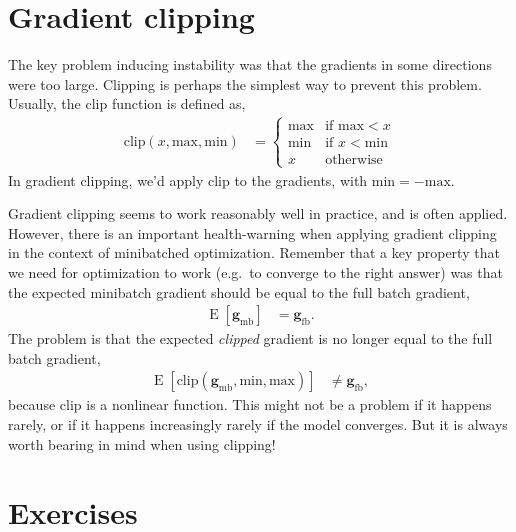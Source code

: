 \documentclass{article}
\newcommand{\bracket}[3]{\left#1 #3 \right#2}
\newcommand{\sqb}{\bracket{[}{]}}
\newcommand{\0}{\mathbf{0}}
\newcommand{\g}{\mathbf{g}}
\newcommand{\gfb}{\g_\text{fb}}
\newcommand{\gmb}{\g_\text{mb}}
\newcommand{\E}{\operatorname{E}\sqb}
\begin{document}
\section{Gradient clipping}

The key problem inducing instability was that the gradients in some directions were too large.
Clipping is perhaps the simplest way to prevent this problem.
Usually, the clip function is defined as,
\begin{align}
  \text{clip}(x, \text{max}, \text{min}) &= \begin{cases}
    \text{max} & \text{if } \text{max} < x\\
    \text{min} & \text{if } x < \text{min} \\
    x & \text{otherwise}
  \end{cases}
\end{align}
In gradient clipping, we'd apply clip to the gradients, with $\text{min} = -\text{max}$.

Gradient clipping seems to work reasonably well in practice, and is often applied.
However, there is an important health-warning when applying gradient clipping in the context of minibatched optimization.
Remember that a key property that we need for optimization to work (e.g.\ to converge to the right answer) was that the expected minibatch gradient should be equal to the full batch gradient,
\begin{align}
  \E{\gmb} &= \gfb.
\end{align}
The problem is that the expected \textit{clipped} gradient is no longer equal to the full batch gradient,
\begin{align}
  \E{\text{clip}(\gmb, \text{min}, \text{max})} &\neq \gfb,
\end{align}
because $\text{clip}$ is a nonlinear function.
This might not be a problem if it happens rarely, or if it happens increasingly rarely if the model converges.
But it is always worth bearing in mind when using clipping!

\section{Exercises}
\end{document}
